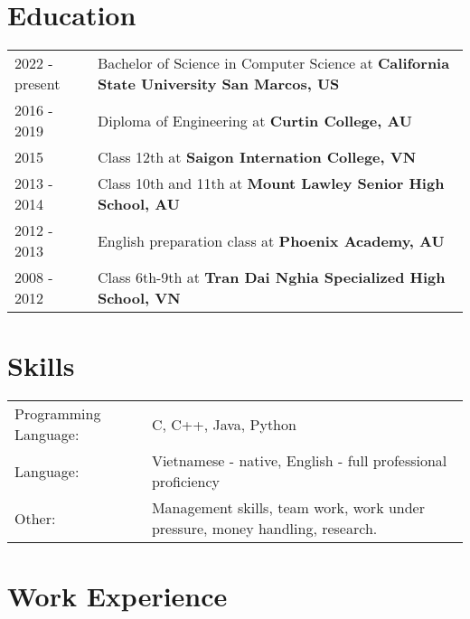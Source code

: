 \documentclass[a4paper,12pt]{article}
\begin{document}
\section{Education}
\begin{tabularx}{\linewidth}{@{}l X@{}}	
2022 - present & Bachelor of Science in Computer Science at \textbf{California State University San Marcos, US}\\

2016 - 2019 & Diploma of Engineering at \textbf{Curtin College, AU}\\ 

2015 & Class 12th at \textbf{Saigon Internation College, VN} \\

2013 - 2014 & Class 10th and 11th at \textbf{Mount Lawley Senior High School, AU} \\

2012 - 2013 & English preparation class at \textbf{Phoenix Academy, AU} \\

2008 - 2012 & Class 6th-9th at \textbf{Tran Dai Nghia Specialized High School, VN} \\
\end{tabularx}


\section{Skills}
\begin{tabularx}{\linewidth}{@{}l X@{}}
Programming Language: &  \normalsize{C, C++, Java, Python}\\
Language:  &  \normalsize{Vietnamese - native, English - full professional proficiency}\\  
Other:& Management skills, team work, work under pressure, money handling, research. \\
\end{tabularx}

\section{Work Experience}
\end{document}
